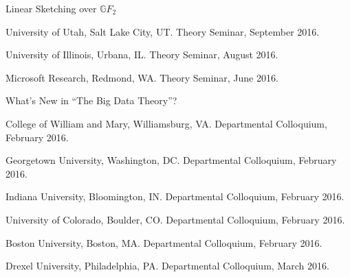 \documentclass[11pt]{article}
\newenvironment{innerlist}[1][\enskip\textbullet]%
        {\begin{compactitem}[#1]}{\end{compactitem}}
\begin{document}
\begin{innerlist}
\item Linear Sketching over $\mathbb{G}F_2$
\begin{innerlist}
\item University of Utah, Salt Lake City, UT. Theory Seminar, September 2016.
\item University of Illinois, Urbana, IL. Theory Seminar, August 2016.
\item Microsoft Research, Redmond, WA. Theory Seminar, June 2016.
\end{innerlist}

\item What's New in ``The Big Data Theory''?
\begin{innerlist}
\item College of William and Mary, Williamsburg, VA. Departmental Colloquium, February 2016.
\item Georgetown University, Washington, DC. Departmental Colloquium, February 2016.
\item Indiana University, Bloomington, IN. Departmental Colloquium, February 2016.
\item University of Colorado, Boulder, CO. Departmental Colloquium, February 2016.
\item Boston University, Boston, MA. Departmental Colloquium, February 2016. 
\item Drexel University, Philadelphia, PA. Departmental Colloquium, March 2016.
\end{innerlist}
\end{innerlist}
\end{document}

